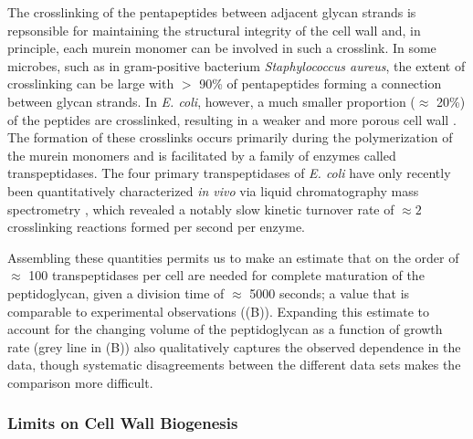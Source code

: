 



The crosslinking of the pentapeptides between adjacent glycan strands is
repsonsible for maintaining the structural integrity of the cell wall and, in
principle, each murein monomer can be involved in such a crosslink. In some
microbes, such as in gram-positive bacterium \textit{Staphylococcus aureus},
the extent of crosslinking can be large with $>$ 90\% of pentapeptides
forming a connection between glycan strands. In \textit{E. coli}, however, a
much smaller proportion ($\approx$ 20\%) of the peptides are crosslinked,
resulting in a weaker and more porous cell wall \cite{vollmer2008a,
rogers1980}. The formation of these crosslinks occurs primarily during the
polymerization of the murein monomers and is facilitated by a family of
enzymes called transpeptidases. The four primary transpeptidases of
\textit{E. coli} have only recently been quantitatively characterized
\textit{in vivo} via liquid chromatography mass spectrometry
\citep{catherwood2020}, which revealed a notably slow kinetic turnover rate
of $\approx 2$ crosslinking reactions formed per second per enzyme.

Assembling these quantities permits us to make an estimate that on the order of
$\approx$ 100 transpeptidases per cell are needed for complete maturation of the
peptidoglycan, given a division time of $\approx$ 5000 seconds; a value that is
comparable to experimental observations ((B)). Expanding this
estimate to account for the changing volume of the peptidoglycan as a function
of growth rate (grey line in (B)) also qualitatively captures
the observed dependence in the data, though systematic disagreements between the
different data sets makes the comparison more difficult.

\subsubsection{Limits on Cell Wall Biogenesis}

